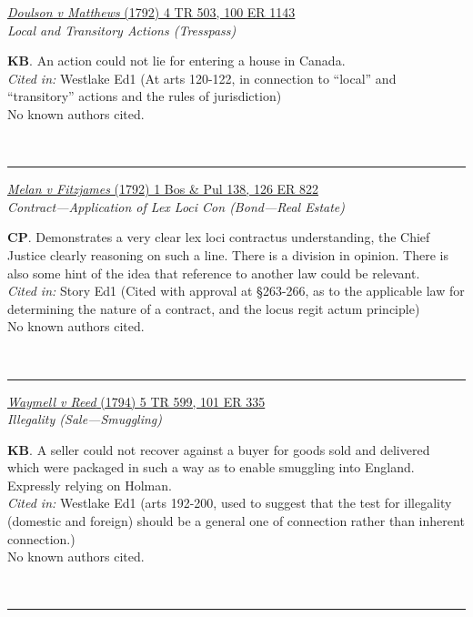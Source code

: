 \documentclass[twoside]{article}
\begin{document}
        \begin{small}
        \begin{center}
        \href{https://heinonline.org/HOL/P?h=hein.engrep/engrf0100&i=1147}{\textit{Doulson v Matthews} (1792) 4 TR 503, 100 ER 1143} \label{13} \\ 
\textit{Local and Transitory Actions (Tresspass)}\\
        \end{center}
        \textbf{KB}. An action could not lie for entering a house in Canada.\\\textit{Cited in: }Westlake Ed1 (At arts 120-122, in connection to “local” and “transitory” actions and the rules of jurisdiction)\\No known authors cited.
        \end{small}\\
        \rule{\textwidth}{0.5pt}
        

        \begin{small}
        \begin{center}
        \href{https://heinonline.org/HOL/P?h=hein.engrep/engrg0126&i=826}{\textit{Melan v Fitzjames} (1792) 1 Bos \& Pul 138, 126 ER 822} \label{30} \\ 
\textit{Contract---Application of Lex Loci Con (Bond---Real Estate)}\\
        \end{center}
        \textbf{CP}. Demonstrates a very clear lex loci contractus understanding, the Chief Justice clearly reasoning on such a line. There is a division in opinion. There is also some hint of the idea that reference to another law could be relevant.\\\textit{Cited in: }Story Ed1 (Cited with approval at §263-266, as to the applicable law for determining the nature of a contract, and the locus regit actum principle)\\No known authors cited.
        \end{small}\\
        \rule{\textwidth}{0.5pt}
        

        \begin{small}
        \begin{center}
        \href{https://heinonline.org/HOL/P?h=hein.engrep/engrf0101&i=339}{\textit{Waymell v Reed} (1794) 5 TR 599, 101 ER 335} \label{68} \\ 
\textit{Illegality (Sale---Smuggling)}\\
        \end{center}
        \textbf{KB}. A seller could not recover against a buyer for goods sold and delivered which were packaged in such a way as to enable smuggling into England. Expressly relying on Holman.\\\textit{Cited in: }Westlake Ed1 (arts 192-200, used to suggest that the test for illegality (domestic and foreign) should be a general one of connection rather than inherent connection.)\\No known authors cited.
        \end{small}\\
        \rule{\textwidth}{0.5pt}
        
\end{document}
